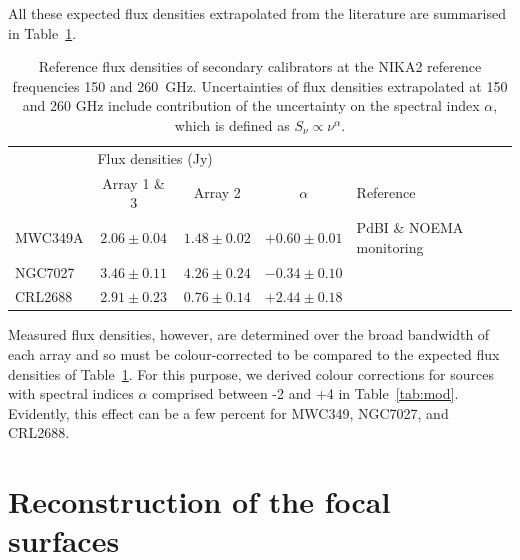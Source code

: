 \documentclass[traditionalabstract]{aa}
\begin{document}
{\begin{appendix}
All these expected flux densities extrapolated from the literature are
summarised in Table~\ref{tab:flux_ref_sec}.

\begin{table}[!thbp]
  \caption[Reference flux densities of secondary calibrators]{Reference flux densities of secondary calibrators at the NIKA2 reference frequencies 150 and 260~GHz. Uncertainties of flux densities extrapolated
    at 150 and 260 GHz include contribution of the uncertainty on the spectral index $\alpha$, which is defined as $S_{\nu} \propto \nu^{\alpha}$.}
  \label{tab:flux_ref_sec}
  \centering    
  \begin{tabular}{lcccl}
    \hline\hline
    \noalign{\smallskip}
    \multicolumn{1}{c}{}  & \multicolumn{2}{l}{Flux  densities (Jy)} & \multicolumn{2}{c}{}  \\
    \noalign{\smallskip}
    &    Array 1 \& 3   &  Array 2          & $\alpha$   &    Reference  \\
    \hline
    \noalign{\smallskip}
    MWC349A   &   $2.06\pm0.04$  &  $1.48\pm0.02$ &  $+0.60\pm0.01$      &  PdBI \& NOEMA monitoring  \\
    NGC7027  &   $3.46\pm0.11$   &  $4.26\pm0.24$  &  $-0.34\pm0.10$     &  \citet{Hoare1992}      \\
    CRL2688  &   $2.91\pm0.23$   &  $0.76\pm0.14$  &  $+2.44\pm0.18$     &  \citet{Dempsey2013_SCUBA2} \\
    \hline
  \end{tabular}
\end{table}

Measured flux densities, however, are determined over the broad
bandwidth of each array and so must be colour-corrected to be compared
to the expected flux densities of Table~\ref{tab:flux_ref_sec}.  For
this purpose, we derived colour corrections for sources with spectral
indices $\alpha$ comprised between -2 and +4 in Table~\ref{tab:mod}. %
Evidently, this effect can be a few percent for MWC349, NGC7027, and CRL2688.


  \section{Reconstruction of the focal surfaces}
  \label{ap:focus_surfaces}


\end{appendix}}
\end{document}

